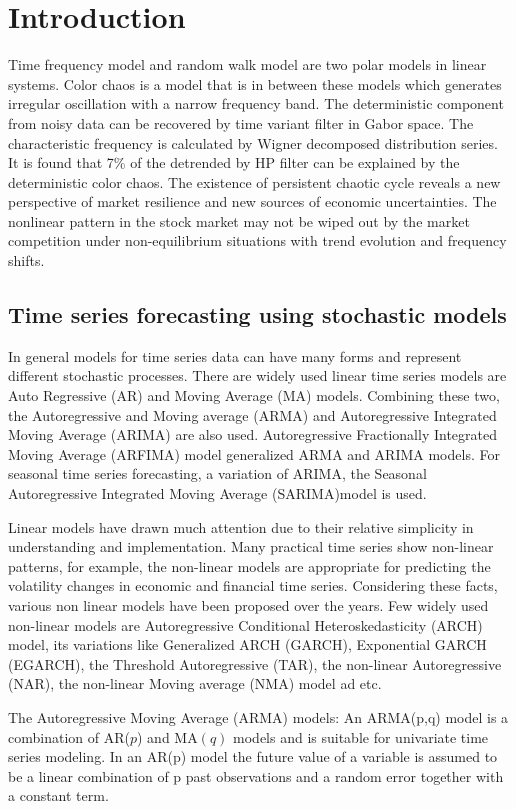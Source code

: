 \documentclass[paper=a4, fontsize=11pt,twoside]{scrartcl}		%
\begin{document}
\section{Introduction}
Time frequency model and random walk model are two polar models in linear systems. Color chaos is a model that is in between these models which generates irregular oscillation with a narrow frequency band. The deterministic component from noisy data can be recovered by time variant filter in Gabor space. The characteristic frequency is calculated by Wigner decomposed distribution series. It is found that 7\% of the detrended by HP filter can be explained by the deterministic color chaos. 	
The existence of persistent chaotic cycle reveals a new perspective of market resilience and new sources of economic uncertainties. The nonlinear pattern in the stock market may not be wiped out by the market competition under non-equilibrium situations with trend evolution and frequency shifts. 

\subsection{Time series forecasting using stochastic models}
In general models for time series data can have many forms and represent different stochastic processes. There are widely used linear time series models are Auto Regressive (AR) and Moving Average (MA) models. Combining these two, the Autoregressive and Moving average (ARMA) and Autoregressive Integrated Moving Average (ARIMA) are also used. Autoregressive Fractionally Integrated Moving Average (ARFIMA) model generalized ARMA and ARIMA models. For seasonal time series forecasting, a variation of ARIMA, the Seasonal Autoregressive Integrated Moving Average (SARIMA)model is used. 

Linear models have drawn much attention due to their relative simplicity in understanding and implementation. Many practical time series show non-linear patterns, for example, the non-linear models are appropriate for predicting the volatility changes in economic and financial time series. Considering these facts, various non linear models have been proposed over the years. Few widely used non-linear models are Autoregressive Conditional Heteroskedasticity (ARCH) model, its variations like Generalized ARCH (GARCH), Exponential GARCH (EGARCH), the Threshold Autoregressive (TAR), the non-linear Autoregressive (NAR), the non-linear Moving average (NMA) model ad etc. 

The Autoregressive Moving Average (ARMA) models:
An ARMA(p,q) model is a combination of AR($p$) and MA$(q)$ models and is suitable for univariate time series modeling. In an AR(p) model the future value of a variable is assumed to be a linear combination of p past observations and a random error together with a constant term. 
\end{document}
